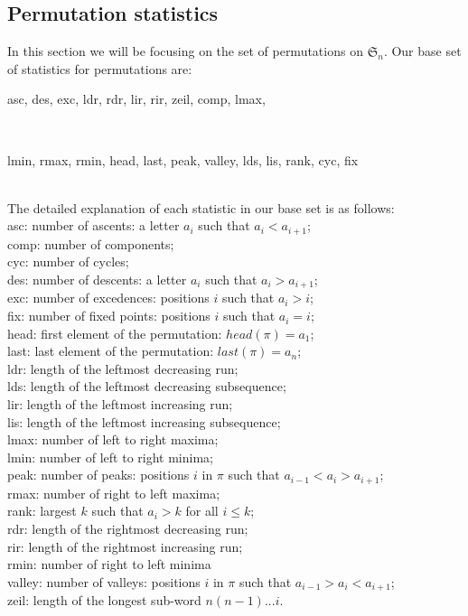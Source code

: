 \documentclass[12pt]{article}
\newcommand{\sym}{\mathfrak{S}}
\begin{document}
\subsection{Permutation statistics}
In this section we will be focusing on the set of permutations on $\sym_n$. Our base set of statistics for permutations are:\\ \centerline{asc, des, exc, ldr, rdr, lir, rir, zeil, comp, lmax,}\\
\centerline{lmin, rmax, rmin, head, last, peak, valley, lds, lis, rank, cyc, fix}\\
The detailed explanation of each statistic in our base set is as follows:\\
asc: number of ascents: a letter $a_i$ such that $a_i < a_{i+1}$;\\
comp: number of components;\\
cyc: number of cycles;\\
des: number of descents: a letter $a_i$ such that $a_i > a_{i+1}$;\\
exc: number of excedences: positions $i$ such that $a_i > i$;\\
fix: number of fixed points: positions $i$ such that $a_i = i$;\\
head: first element of the permutation: $head(\pi) = a_1$;\\
last: last element of the permutation: $last(\pi) = a_n$;\\
ldr: length of the leftmost decreasing run;\\
lds: length of the leftmost decreasing subsequence;\\
lir: length of the leftmost increasing run;\\
lis: length of the leftmost increasing subsequence;\\
lmax: number of left to right maxima;\\
lmin: number of left to right minima;\\
peak: number of peaks: positions $i$ in $\pi$ such that $a_{i-1} < a_i > a_{i+1}$;\\
rmax: number of right to left maxima;\\
rank: largest $k$ such that $a_i > k$ for all $i \leq k$;\\
rdr: length of the rightmost decreasing run;\\
rir: length of the rightmost increasing run;\\
rmin: number of right to left minima\\
valley: number of valleys: positions $i$ in $\pi$ such that $a_{i-1} > a_i < a_{i+1}$;\\
zeil: length of the longest sub-word $n(n-1)...i$.\\
\end{document}
